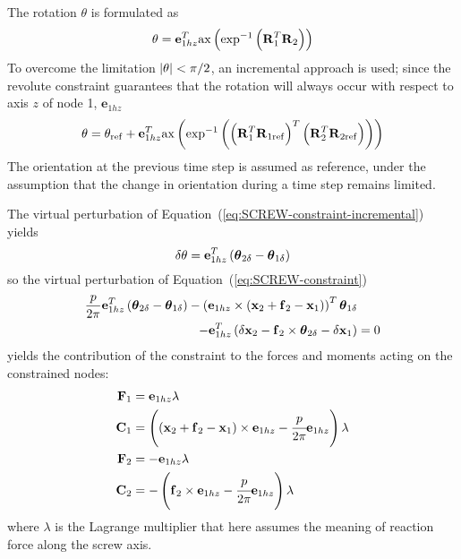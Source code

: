 \documentclass[10pt,dvips,fleqn,subeqn]{report}
\newcommand{\T}[1]{\bm{\mathbf{#1}}}
\begin{document}
The rotation $\theta$ is formulated as
\begin{equation}
	\theta = \T{e}_{1hz}^T \llk{ax}\plbr{\llk{exp}^{-1}\plbr{\T{R}_1^T \T{R}_2}}
\end{equation}
To overcome the limitation $\left| \theta \right|<\pi/2$, an incremental
approach is used; since the revolute constraint guarantees that
the rotation will always occur with respect to axis $z$ of node 1,
$\T{e}_{1hz}$
\begin{equation}
	\label{eq:SCREW-constraint-incremental}
	\theta = \theta_{\llk{ref}}
		+ \T{e}_{1hz}^T \llk{ax}\plbr{\llk{exp}^{-1}\plbr{\plbr{\T{R}_1^T \T{R}_{1\llk{ref}}}^T \plbr{\T{R}_2^T \T{R}_{2\llk{ref}}}}}
\end{equation}
The orientation at the previous time step is assumed as reference,
under the assumption that the change in orientation during a time step 
remains limited.

The virtual perturbation of Equation~(\ref{eq:SCREW-constraint-incremental})
yields
\begin{equation}
	\delta\theta = \T{e}_{1hz}^T\plbr{\T{\theta}_{2\delta} - \T{\theta}_{1\delta}}
\end{equation}
so the virtual perturbation of Equation~(\ref{eq:SCREW-constraint})
\begin{align*}
	\frac{p}{2 \pi} \T{e}_{1hz}^T\plbr{\T{\theta}_{2\delta} - \T{\theta}_{1\delta}}
	- \plbr{\T{e}_{1hz} \times \plbr{\T{x}_2 + \T{f}_2 - \T{x}_1}}^T \T{\theta}_{1\delta} & \\
	- \T{e}_{1hz}^T\plbr{\delta\T{x}_2 - \T{f}_2 \times \T{\theta}_{2\delta} - \delta\T{x}_1} &= 0
\end{align*}
yields the contribution of the constraint to the forces and moments
acting on the constrained nodes:
\begin{align*}
	\T{F}_1 &= \T{e}_{1hz} \lambda \\
	\T{C}_1 &= \plbr{
		\plbr{\T{x}_2 + \T{f}_2 - \T{x}_1} \times \T{e}_{1hz} 
		- \cfrac{p}{2 \pi} \T{e}_{1hz}
	} \lambda \\
	\T{F}_2 &= - \T{e}_{1hz} \lambda \\
	\T{C}_2 &= - \plbr{
		\T{f}_2 \times \T{e}_{1hz}
		- \cfrac{p}{2 \pi} \T{e}_{1hz}
	} \lambda
\end{align*}
where $\lambda$ is the Lagrange multiplier that here assumes the meaning
of reaction force along the screw axis.
\end{document}
